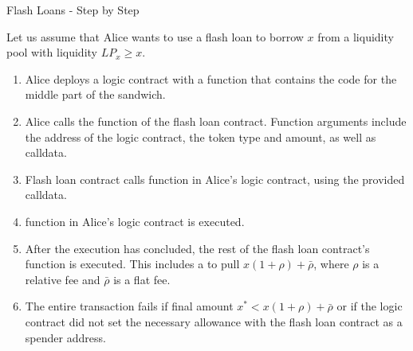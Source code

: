 \documentclass[handout]{beamer}
\begin{document}
\begin{frame}{Flash Loans - Step by Step}

\small

Let us assume that Alice wants to use a flash loan to borrow $x$ from a liquidity pool with liquidity $LP_x \geq x$. \\

\begin{enumerate}
	\item<2->[1.] Alice deploys a logic contract with a  function that contains the code for the middle part of the sandwich. %
	\item<3->[2a.] Alice calls the  function of the flash loan contract. Function arguments include the address of the logic contract, the token type and amount, as well as calldata.
	\item<4->[2b.] Flash loan contract calls  function in Alice's logic contract, using the provided calldata.
	\item<5->[2c.]  function in Alice's logic contract is executed.
	\item<6->[2d.] After the execution has  concluded, the rest of the flash loan contract's  function is executed. This includes a  to pull $x(1+\rho)+\bar{\rho}$, where $\rho$ is a relative fee and $\bar{\rho}$ is a flat fee.
	\item<7->[2e.] The entire transaction fails if final amount $x^* < x(1+\rho)+\bar{\rho}$ or if the logic contract did not set the necessary allowance with the flash loan contract as a spender address.
\end{enumerate}

\end{frame}
\end{document}
